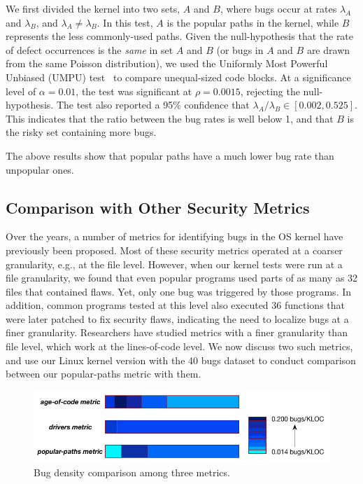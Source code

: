 We first divided the kernel into two sets,
$A$ and $B$, where bugs occur at rates $\lambda_A$ and
$\lambda_B$, and $\lambda_A \neq \lambda_B$. In this test, $A$ is the popular
paths in the kernel, while $B$
represents the less commonly-used paths. Given the null-hypothesis
that the rate of defect occurrences is the \textit{same} in set $A$ and $B$
(or bugs in $A$ and $B$ are drawn from the same Poisson distribution),
we used the Uniformly Most Powerful Unbiased (UMPU) test~\cite{shiue1982experiment}
to compare unequal-sized code blocks.
At a significance level of $\alpha=0.01$, the test was significant at
$\rho=0.0015$, rejecting the null-hypothesis.
The test also reported a 95\% confidence that $\lambda_A / \lambda_B
\in [0.002, 0.525]$. This indicates that the ratio between the bug rates is well
below 1, and that $B$ is the risky set containing more bugs. 

The above results show that
popular paths have a much lower bug rate than unpopular ones.

\subsection{Comparison with Other Security Metrics}

Over the years, a number of metrics for identifying bugs in the OS kernel have
previously been proposed. Most of these security metrics operated at a coarser granularity,
e.g., at the file level. However, when our kernel tests were run at a file
granularity, we found that even popular programs used parts of as many as
32 files that contained flaws. Yet, only one bug was triggered by those programs.
In addition, common programs tested at this level also executed 36 functions
that were later patched to fix security
flaws, indicating the need to localize bugs at a finer granularity. 
Researchers have studied metrics with a finer granularity than file level, which work 
at the lines-of-code level. 
We now discuss two such metrics, and use our Linux kernel version with the 40 bugs dataset 
to conduct comparison between our popular-paths metric with them. 

\begin{figure}
\centering
\includegraphics[width=1.2\columnwidth]{diagram/bug_density.png}
\caption{\small Bug density comparison among three metrics.}
\label{fig:bug_density}
\end{figure}

